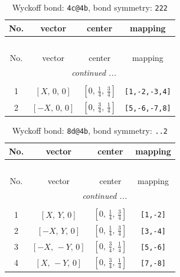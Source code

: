 \documentclass[fleqn,8pt]{jsarticle}
\begin{document}
\begin{longtable}{cccc}
\caption{Wyckoff bond: {\tt 4c@4b}, bond symmetry: {\tt 222}}
 \\
 \hline \hline
No. & vector & center & mapping \\ \hline \endfirsthead

\multicolumn{3}{l}{\tablename\ \thetable{}} \\
 \hline \hline
No. & vector & center & mapping \\ \hline \endhead

 \hline \hline
\multicolumn{3}{r}{\footnotesize\it continued ...} \\ \endfoot

 \hline \hline
\multicolumn{3}{r}{} \\ \endlastfoot

1 & $\left[ X,\, 0,\, 0 \right]$ & $\left[ 0,\, \frac{1}{4},\, \frac{3}{4} \right]$ & {\tt [1,-2,-3,4]} \\ \hline
2 & $\left[ - X,\, 0,\, 0 \right]$ & $\left[ 0,\, \frac{3}{4},\, \frac{1}{4} \right]$ & {\tt [5,-6,-7,8]} \\
\end{longtable}
\renewcommand{\arraystretch}{1.2}
\begin{longtable}{cccc}
\caption{Wyckoff bond: {\tt 8d@4b}, bond symmetry: {\tt ..2}}
 \\
 \hline \hline
No. & vector & center & mapping \\ \hline \endfirsthead

\multicolumn{3}{l}{\tablename\ \thetable{}} \\
 \hline \hline
No. & vector & center & mapping \\ \hline \endhead

 \hline \hline
\multicolumn{3}{r}{\footnotesize\it continued ...} \\ \endfoot

 \hline \hline
\multicolumn{3}{r}{} \\ \endlastfoot

1 & $\left[ X,\, Y,\, 0 \right]$ & $\left[ 0,\, \frac{1}{4},\, \frac{3}{4} \right]$ & {\tt [1,-2]} \\ \hline
2 & $\left[ - X,\, Y,\, 0 \right]$ & $\left[ 0,\, \frac{1}{4},\, \frac{3}{4} \right]$ & {\tt [3,-4]} \\ \hline
3 & $\left[ - X,\, - Y,\, 0 \right]$ & $\left[ 0,\, \frac{3}{4},\, \frac{1}{4} \right]$ & {\tt [5,-6]} \\ \hline
4 & $\left[ X,\, - Y,\, 0 \right]$ & $\left[ 0,\, \frac{3}{4},\, \frac{1}{4} \right]$ & {\tt [7,-8]} \\
\end{longtable}
\end{document}
